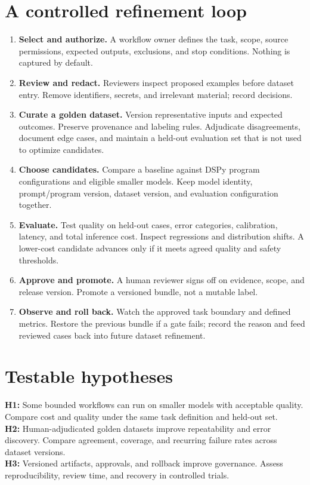 \documentclass[11pt]{article}
\begin{document}
\section{A controlled refinement loop}
\begin{enumerate}[leftmargin=1.7em]
\item \textbf{Select and authorize.} A workflow owner defines the task, scope, source permissions, expected outputs, exclusions, and stop conditions. Nothing is captured by default.
\item \textbf{Review and redact.} Reviewers inspect proposed examples before dataset entry. Remove identifiers, secrets, and irrelevant material; record decisions.
\item \textbf{Curate a golden dataset.} Version representative inputs and expected outcomes. Preserve provenance and labeling rules. Adjudicate disagreements, document edge cases, and maintain a held-out evaluation set that is not used to optimize candidates.
\item \textbf{Choose candidates.} Compare a baseline against DSPy program configurations and eligible smaller models. Keep model identity, prompt/program version, dataset version, and evaluation configuration together.
\item \textbf{Evaluate.} Test quality on held-out cases, error categories, calibration, latency, and total inference cost. Inspect regressions and distribution shifts. A lower-cost candidate advances only if it meets agreed quality and safety thresholds.
\item \textbf{Approve and promote.} A human reviewer signs off on evidence, scope, and release version. Promote a versioned bundle, not a mutable label.
\item \textbf{Observe and roll back.} Watch the approved task boundary and defined metrics. Restore the previous bundle if a gate fails; record the reason and feed reviewed cases back into future dataset refinement.
\end{enumerate}
\section{Testable hypotheses}
\textbf{H1:} Some bounded workflows can run on smaller models with acceptable quality. Compare cost and quality under the same task definition and held-out set.\\
\textbf{H2:} Human-adjudicated golden datasets improve repeatability and error discovery. Compare agreement, coverage, and recurring failure rates across dataset versions.\\
\textbf{H3:} Versioned artifacts, approvals, and rollback improve governance. Assess reproducibility, review time, and recovery in controlled trials.
\end{document}
